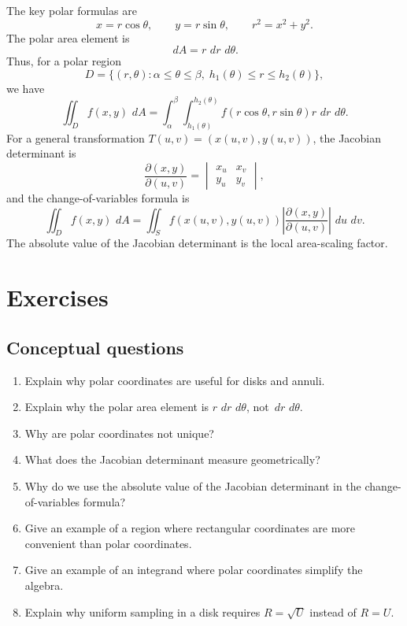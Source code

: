 \documentclass[11pt]{article}
\newcommand{\dd}{\,d}
\newcommand{\Jac}{\frac{\partial(x,y)}{\partial(u,v)}}
\begin{document}
The key polar formulas are
\[
x=r\cos\theta,\qquad y=r\sin\theta,\qquad r^2=x^2+y^2.
\]
The polar area element is
\[
\dd A=r\,\dd r\,\dd\theta.
\]
Thus, for a polar region
\[
D=\{(r,\theta):\alpha\le\theta\le\beta,\; h_1(\theta)\le r\le h_2(\theta)\},
\]
we have
\[
\iint_D f(x,y)\,\dd A
=\int_\alpha^\beta\int_{h_1(\theta)}^{h_2(\theta)} f(r\cos\theta,r\sin\theta)r\,\dd r\,\dd\theta.
\]
For a general transformation $T(u,v)=(x(u,v),y(u,v))$, the Jacobian determinant is
\[
\Jac=\begin{vmatrix}x_u&x_v\\y_u&y_v\end{vmatrix},
\]
and the change-of-variables formula is
\[
\iint_D f(x,y)\,\dd A
=\iint_S f(x(u,v),y(u,v))\left|\Jac\right|\,\dd u\,\dd v.
\]
The absolute value of the Jacobian determinant is the local area-scaling factor.

\section{Exercises}

\subsection*{Conceptual questions}
\begin{enumerate}
  \item Explain why polar coordinates are useful for disks and annuli.
  \item Explain why the polar area element is $r\,\dd r\,\dd\theta$, not $\dd r\,\dd\theta$.
  \item Why are polar coordinates not unique?
  \item What does the Jacobian determinant measure geometrically?
  \item Why do we use the absolute value of the Jacobian determinant in the change-of-variables formula?
  \item Give an example of a region where rectangular coordinates are more convenient than polar coordinates.
  \item Give an example of an integrand where polar coordinates simplify the algebra.
  \item Explain why uniform sampling in a disk requires $R=\sqrt U$ instead of $R=U$.
\end{enumerate}
\end{document}
